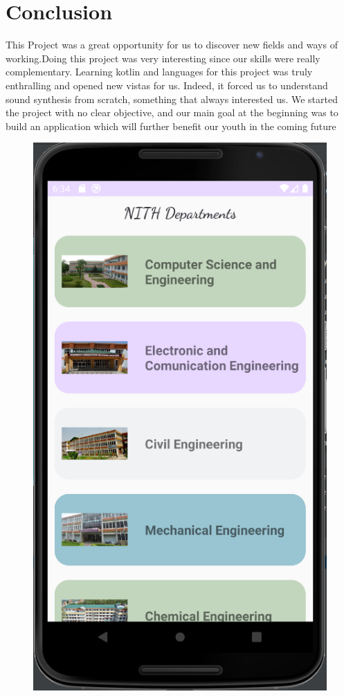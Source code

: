 \documentclass[11pt,a4paper]{report}
\begin{document}
\chapter{Conclusion}
This Project was a great opportunity for us to discover new fields and ways of working.Doing this project was very interesting since our skills were really complementary. Learning kotlin and languages for this project was truly enthralling and opened new vistas for us. Indeed, it forced us to understand sound synthesis from scratch, something that always interested us. We started the project with no clear objective, and our main goal at the beginning was to build an application which will further benefit our youth in the coming future
\begin{figure}[H]
  \centering
  \begin{minipage}[b]{0.4\textwidth}
    \includegraphics[width=\textwidth]{./img/Capture1.png}

\end{minipage}
\end{figure}
\end{document}
